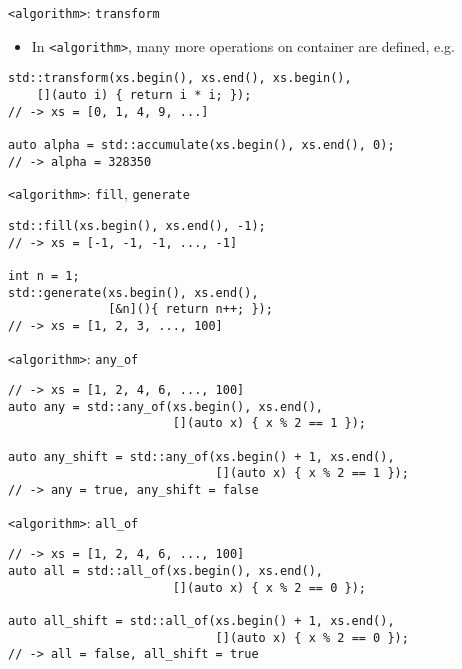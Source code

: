 \documentclass[10pt]{beamer}
\begin{document}
\begin{frame}[fragile,label={sec:org2ef4665}]{\texttt{<algorithm>}: \texttt{transform}}
 \begin{itemize}
\item In \texttt{<algorithm>}, many more operations on container are defined, e.g.
\end{itemize}

\begin{verbatim}
std::transform(xs.begin(), xs.end(), xs.begin(),
    [](auto i) { return i * i; });
// -> xs = [0, 1, 4, 9, ...]

auto alpha = std::accumulate(xs.begin(), xs.end(), 0);
// -> alpha = 328350
\end{verbatim}
\end{frame}

\begin{frame}[fragile,label={sec:org64d2505}]{\texttt{<algorithm>}: \texttt{fill}, \texttt{generate}}
 \begin{verbatim}
std::fill(xs.begin(), xs.end(), -1);
// -> xs = [-1, -1, -1, ..., -1]

int n = 1;
std::generate(xs.begin(), xs.end(),
              [&n](){ return n++; });
// -> xs = [1, 2, 3, ..., 100]
\end{verbatim}
\end{frame}

\begin{frame}[fragile,label={sec:org485c440}]{\texttt{<algorithm>}: \texttt{any\_of}}
 \begin{verbatim}
// -> xs = [1, 2, 4, 6, ..., 100]
auto any = std::any_of(xs.begin(), xs.end(),
                       [](auto x) { x % 2 == 1 });

auto any_shift = std::any_of(xs.begin() + 1, xs.end(),
                             [](auto x) { x % 2 == 1 });
// -> any = true, any_shift = false
\end{verbatim}
\end{frame}


\begin{frame}[fragile,label={sec:orgc4cfdd7}]{\texttt{<algorithm>}: \texttt{all\_of}}
 \begin{verbatim}
// -> xs = [1, 2, 4, 6, ..., 100]
auto all = std::all_of(xs.begin(), xs.end(),
                       [](auto x) { x % 2 == 0 });

auto all_shift = std::all_of(xs.begin() + 1, xs.end(),
                             [](auto x) { x % 2 == 0 });
// -> all = false, all_shift = true
\end{verbatim}
\end{frame}
\end{document}

